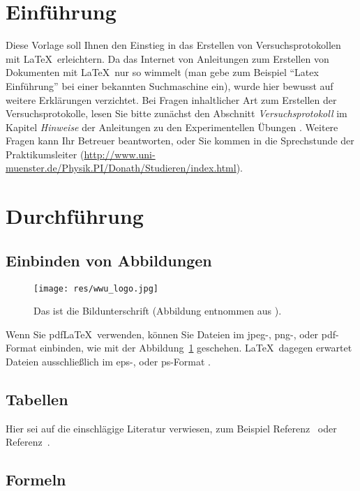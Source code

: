 \section{Einführung}

Diese Vorlage soll Ihnen den Einstieg in das Erstellen von Versuchsprotokollen mit \LaTeX\ erleichtern. Da das Internet von Anleitungen zum Erstellen von Dokumenten mit \LaTeX\ nur so wimmelt (man gebe zum Beispiel ``Latex Einführung'' bei einer bekannten Suchmaschine ein), wurde hier bewusst auf weitere Erklärungen verzichtet. Bei Fragen inhaltlicher Art zum Erstellen der Versuchsprotokolle, lesen Sie bitte zunächst den Abschnitt \emph{Versuchsprotokoll} im Kapitel \emph{Hinweise} der Anleitungen zu den Experimentellen Übungen \cite{anleitung}. Weitere Fragen kann Ihr Betreuer beantworten, oder Sie kommen in die Sprechstunde der Praktikumsleiter (\url{http://www.uni-muenster.de/Physik.PI/Donath/Studieren/index.html}).

\section{Durchführung}

\subsection{Einbinden von Abbildungen}

\begin{figure}[htb]
  \centering
    \texttt{[image: res/wwu\_logo.jpg]} %
  \caption{Das ist die Bildunterschrift (Abbildung entnommen aus \cite{billwatterson}).}\label{CandH}
\end{figure}

Wenn Sie pdf\LaTeX\ verwenden, können Sie Dateien im jpeg-, png-, oder pdf-Format einbinden, wie mit der Abbildung~\ref{CandH} geschehen. \LaTeX\ dagegen erwartet Dateien ausschließlich im eps-, oder ps-Format \cite{andyroberts}.

\subsection{Tabellen}

Hier sei auf die einschlägige Literatur verwiesen, zum Beispiel Referenz~\cite{andyroberts} oder Referenz~\cite{hobbits}.

\subsection{Formeln}

